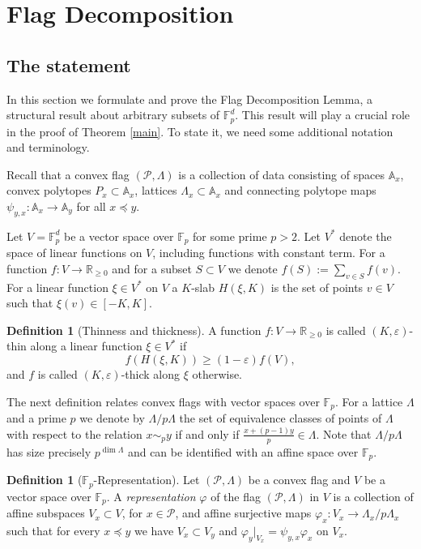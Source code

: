 \documentclass{daj}
\renewcommand{\ge}{\geqslant}
\newcommand{\R}{\mathbb R}
\newcommand{\A}{\mathbb A}
\newcommand{\FF}{\mathbb F}
\renewcommand{\P}{\mathcal P}
\theoremstyle{definition}
\newtheorem{defi}[theorem]{Definition}
\theoremstyle{remark}
\theoremstyle{definition}
\theoremstyle{definition}
\begin{document}
\section{Flag Decomposition}\label{sfdl}


\subsection{The statement}\label{fdlst}

In this section we formulate and prove the Flag Decomposition Lemma, a structural result about arbitrary subsets of $\FF_p^d$. This result will play a crucial role in the proof of Theorem \ref{main}. To state it, we need some additional notation and terminology.

Recall that a convex flag $(\P, \Lambda)$ is a collection of data consisting of spaces $\A_x$, convex polytopes $P_x \subset \A_x$, lattices $\Lambda_x \subset \A_x$ and connecting polytope maps $\psi_{y, x}: \A_x \rightarrow \A_y$ for all $x \preceq y$.

Let $V= \FF_p^d$ be a vector space over $\FF_p$ for some prime $p>2$. Let $V^*$ denote the space of linear functions on $V$, including functions with constant term.
For a function $f: V \rightarrow \R_{\ge 0}$ and for a subset $S \subset V$ we denote $f(S) := \sum_{v \in S} f(v)$. 
For a linear function $\xi \in V^*$ on $V$ a $K$-slab $H(\xi, K)$ is the set of points $v \in V$ such that $\xi(v) \in [-K, K]$. 

\begin{defi}[Thinness and thickness]\label{tt}
A function $f: V \rightarrow \R_{\ge 0}$ is called $(K, \varepsilon)$-thin along a linear function $\xi \in V^*$ if 
$$
f(H(\xi, K)) \ge (1 - \varepsilon) f(V),
$$
and $f$ is called $(K, \varepsilon)$-thick along $\xi$ otherwise.
\end{defi}



The next definition relates convex flags with vector spaces over $\FF_p$. For a lattice $\Lambda$ and a prime $p$ we denote by $\Lambda / p\Lambda$ the set of equivalence classes of points of $\Lambda$ with respect to the relation $x \sim_p y$ if and only if $\frac{x + (p-1)y}{p} \in \Lambda$. Note that $\Lambda / p\Lambda$ has size precisely $p^{\dim \Lambda}$ and can be identified with an affine space over $\FF_p$.

\begin{defi}[$\FF_p$-Representation]
Let $(\P, \Lambda)$ be a convex flag and $V$ be a vector space over $\FF_p$. A {\em representation} $\varphi$ of the flag $(\P, \Lambda)$ in $V$ is a collection of affine subspaces $V_x \subset V$, for $x \in \P$, and affine surjective maps $\varphi_x: V_x \rightarrow \Lambda_x / p\Lambda_x$ such that for every $x \preceq y$ we have $V_x \subset V_y$ and $\varphi_y|_{V_x} = \psi_{y, x} \varphi_x$ on $V_x$.
\end{defi}
\end{document}
